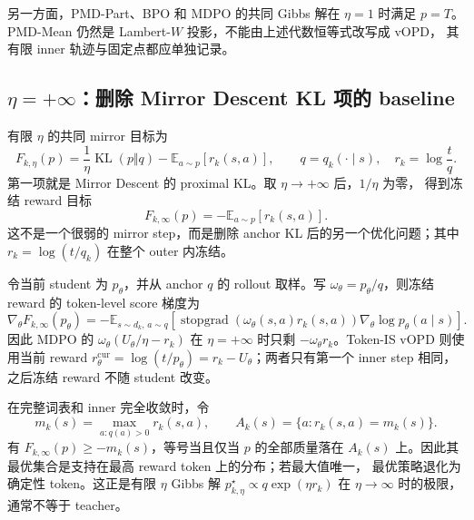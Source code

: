 \documentclass[lang=cn,scheme=chinese,openany]{../book/elegantbook}
\newcommand{\sg}{\operatorname{stopgrad}}
\begin{document}
另一方面，PMD-Part、BPO 和 MDPO 的共同 Gibbs 解在 $\eta=1$ 时满足 $p=T$。PMD-Mean 仍然是 Lambert-$W$ 投影，不能由上述代数恒等式改写成 vOPD， 其有限 inner 轨迹与固定点都应单独记录。

\subsection{$\eta=+\infty$：删除 Mirror Descent KL 项的 baseline}
\label{subsec:ch2-opd-eta-infinity}

有限 $\eta$ 的共同 mirror 目标为
\begin{equation}
\label{eq:ch2-opd-mirror-objective-eta}
F_{k,\eta}(p)=\frac{1}{\eta}\operatorname{KL}(p\Vert q)-\mathbb E_{a\sim p}[r_k(s,a)],
\qquad q=q_k(\cdot\mid s),\quad r_k=\log\frac{t}{q}.
\end{equation}
第一项就是 Mirror Descent 的 proximal KL。取 $\eta\to+\infty$ 后，$1/\eta$ 为零， 得到冻结 reward 目标
\begin{equation}
\label{eq:ch2-opd-frozen-reward-objective}
F_{k,\infty}(p)=-\mathbb E_{a\sim p}[r_k(s,a)].
\end{equation}
这不是一个很弱的 mirror step，而是删除 anchor KL 后的另一个优化问题；其中 $r_k=\log(t/q_k)$ 在整个 outer 内冻结。

令当前 student 为 $p_\theta$，并从 anchor $q$ 的 rollout 取样。写 $\omega_\theta=p_\theta/q$，则冻结 reward 的 token-level score 梯度为
\begin{equation}
\label{eq:ch2-opd-frozen-reward-gradient}
\nabla_\theta F_{k,\infty}(p_\theta)
=-\mathbb E_{s\sim d_k,\,a\sim q}
\left[\sg\!\left(\omega_\theta(s,a)r_k(s,a)\right)
\nabla_\theta\log p_\theta(a\mid s)\right].
\end{equation}
因此 MDPO 的 $\omega_\theta(U_\theta/\eta-r_k)$ 在 $\eta=+\infty$ 时只剩 $-\omega_\theta r_k$。Token-IS vOPD 则使用当前 reward $r_\theta^{\mathrm{cur}}=\log(t/p_\theta)=r_k-U_\theta$；两者只有第一个 inner step 相同，之后冻结 reward 不随 student 改变。

在完整词表和 inner 完全收敛时，令
\begin{equation}
m_k(s)=\max_{a:q(a)>0}r_k(s,a),\qquad
A_k(s)=\{a:r_k(s,a)=m_k(s)\}.
\end{equation}
有 $F_{k,\infty}(p)\geq-m_k(s)$，等号当且仅当 $p$ 的全部质量落在 $A_k(s)$ 上。因此其最优集合是支持在最高 reward token 上的分布；若最大值唯一， 最优策略退化为确定性 token。这正是有限 $\eta$ Gibbs 解 $p_{k,\eta}^\star\propto q\exp(\eta r_k)$ 在 $\eta\to\infty$ 时的极限， 通常不等于 teacher。
\end{document}
